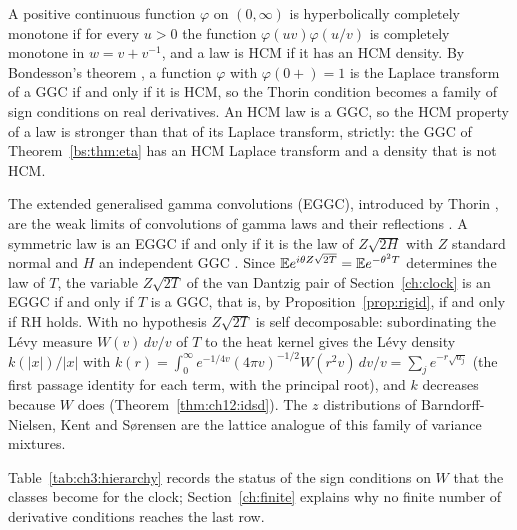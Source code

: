 A positive continuous function $\varphi$ on $(0,\infty)$ is hyperbolically completely monotone if for every $u>0$ the function $\varphi(uv)\varphi(u/v)$ is completely monotone in $w=v+v^{-1}$, and a law is HCM if it has an HCM density. By Bondesson's theorem \cite[Theorem 6.1.1]{Bondesson}, a function $\varphi$ with $\varphi(0+)=1$ is the Laplace transform of a GGC if and only if it is HCM, so the Thorin condition becomes a family of sign conditions on real derivatives. An HCM law is a GGC, so the HCM property of a law is stronger than that of its Laplace transform, strictly: the GGC of Theorem~\ref{bs:thm:eta} has an HCM Laplace transform and a density that is not HCM.

\begin{resultpar}
The extended generalised gamma convolutions (EGGC), introduced by Thorin \cite{Thorin78}, are the weak limits of convolutions of gamma laws and their reflections \cite[Section 7.1]{Bondesson}. A symmetric law is an EGGC if and only if it is the law of $Z\sqrt{2H}$ with $Z$ standard normal and $H$ an independent GGC \cite[Theorem 7.3.1]{Bondesson}. Since $\mathbb{E} e^{i\theta Z\sqrt{2T}}=\mathbb{E} e^{-\theta^2T}$ determines the law of $T$, the variable $Z\sqrt{2T}$ of the van Dantzig pair of Section~\ref{ch:clock} is an EGGC if and only if $T$ is a GGC, that is, by Proposition~\ref{prop:rigid}, if and only if RH holds. With no hypothesis $Z\sqrt{2T}$ is self decomposable: subordinating the L\'evy measure $W(v)\,dv/v$ of $T$ to the heat kernel gives the L\'evy density $k(|x|)/|x|$ with $k(r)=\int_0^\infty e^{-1/4v}(4\pi v)^{-1/2}W(r^2v)\,dv/v=\sum_je^{-r\sqrt{a_j}}$ (the first passage identity for each term, with the principal root), and $k$ decreases because $W$ does (Theorem~\ref{thm:ch12:idsd}).\label{tx3:res:sdz} The $z$ distributions of Barndorff-Nielsen, Kent and S{\o}rensen \cite{BNKS82} are the lattice analogue of this family of variance mixtures.
\end{resultpar}

Table~\ref{tab:ch3:hierarchy} records the status of the sign conditions on $W$ that the classes become for the clock; Section~\ref{ch:finite} explains why no finite number of derivative conditions reaches the last row.

